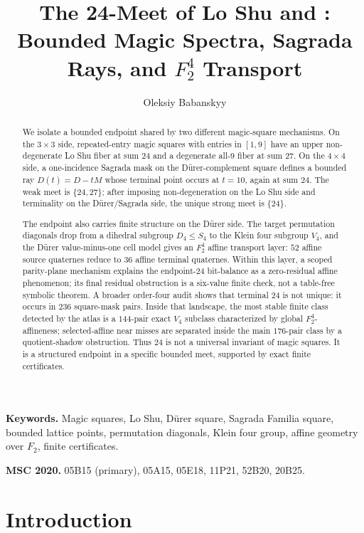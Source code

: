 \documentclass[11pt,a4paper]{article}
\title{The 24-Meet of Lo Shu and \Durer:\\
Bounded Magic Spectra, Sagrada Rays, and \(F_2^4\) Transport}
\author{Oleksiy Babanskyy}
\date{}
\theoremstyle{definition}
\theoremstyle{remark}
\newcommand{\Durer}{D\"urer\xspace}
\begin{document}
\maketitle

\begin{abstract}
We isolate a bounded endpoint shared by two different magic-square
mechanisms.  On the \(3\times3\) side, repeated-entry magic squares with
entries in \([1,9]\) have an upper non-degenerate Lo Shu fiber at sum \(24\)
and a degenerate all-9 fiber at sum \(27\).  On the \(4\times4\) side, a
one-incidence Sagrada mask on the \Durer-complement square defines a bounded
ray \(D(t)=D-tM\) whose terminal point occurs at \(t=10\), again at sum
\(24\).  The weak meet is \(\{24,27\}\); after imposing non-degeneration on
the Lo Shu side and terminality on the \Durer/Sagrada side, the unique strong
meet is \(\{24\}\).

The endpoint also carries finite structure on the \Durer side.  The target
permutation diagonals drop from a dihedral subgroup \(D_4\le S_4\) to the
Klein four subgroup \(V_4\), and the \Durer value-minus-one cell model gives
an \(F_2^4\) affine transport layer: \(52\) affine source quaternes reduce to
\(36\) affine terminal quaternes.  Within this layer, a scoped parity-plane
mechanism explains the endpoint-24 bit-balance as a zero-residual affine
phenomenon; its final residual obstruction is a six-value finite check, not a
table-free symbolic theorem.  A broader order-four audit shows that
terminal \(24\) is not unique: it occurs in \(236\) square-mask pairs.  Inside
that landscape, the most stable finite class detected by the atlas is a
\(144\)-pair exact \(V_4\) subclass characterized by global
\(F_2^4\)-affineness; selected-affine near misses are separated inside the
main \(176\)-pair class by a quotient-shadow obstruction.  Thus \(24\) is not
a universal invariant of magic squares.  It is a structured endpoint in a
specific bounded meet, supported by exact finite certificates.
\end{abstract}

\noindent\textbf{Keywords.} Magic squares, Lo Shu, \Durer square, Sagrada
Familia square, bounded lattice points, permutation diagonals, Klein four
group, affine geometry over \(F_2\), finite certificates.

\smallskip
\noindent\textbf{MSC 2020.} 05B15 (primary), 05A15, 05E18, 11P21, 52B20,
20B25.

\section{Introduction}
\end{document}
